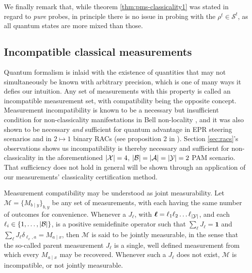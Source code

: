 \documentclass[a4paper,preprintnumbers,floatfix,superscriptaddress,pra,twocolumn,showpacs,notitlepage,longbibliography]{revtex4-2}
\begin{document}
    We finally remark that, while theorem \ref{thm:pms-classicality1} was stated in regard to \emph{pure} probes, in principle there is no issue in probing with the $\rho^t \in  \mathcal{S}^t$, as all quantum states are more mixed than those. 

    
    \subsection{Incompatible classical measurements}
    
        Quantum formalism is inlaid with the existence of quantities that may not simultaneously be known with arbitrary precision, which is one of many ways it defies our intuition. Any set of measurements with this property is called an incompatible measurement set, with compatibility being the opposite concept. Measurement incompatibility is known to be a necessary but insufficient condition for non-classicality manifestations in Bell non-locality \cite{bene-incompatibility-2018,hirsch-incompatibility-2018}, and it was also shown to be necessary \emph{and} sufficient for quantum advantage in EPR steering scenarios \cite{quintino-incompatibility-2014} and in $2 \mapsto 1$ binary RACs (see proposition 2 in \cite{carmeli-racs-2020}). Section \ref{sec:racs}'s observations shows us incompatibility is thereby necessary and sufficient for non-classicality in the aforementioned $\abs{\mathcal{X}} = 4$, $\abs{\mathcal{B}} = \abs{\mathcal{A}} = \abs{\mathcal{Y}} = 2$ PAM scenario. That sufficiency does not hold in general will be shown through an application of our measurements' classicality certification method.
        
        Measurement compatibility may be understood as joint measurability. Let $\mathcal{M} =  \{ M_{b \mid y} \}_{b, y}$ be any set of measurements, with each having the same number of outcomes for convenience. Whenever a $J_{\bm{\ell}}$, with $\bm{\ell} = \ell_1 \ell_2 \ldots \ell_\abs{\mathcal{Y}}$, and each $\ell_i \in \{ 1, \ldots, \abs{\mathcal{B}} \}$, is a positive semidefinite operator such that $\sum_{\bm{\ell}} J_{\bm{\ell}} = \bm{1}$ and $\sum_{\bm{\ell}} J_{\bm{\ell}} \delta_{\ell_x, a} = M_{a \mid x}$, then $\mathcal{M}$ is said to be jointly measurable, in the sense that the so-called parent measurement $J_{\bm{\ell}}$ is a single, well defined measurement from which every $M_{a \mid x}$ may be recovered. Whenever such a $J_{\bm{\ell}}$ does not exist, $\mathcal{M}$ is incompatible, or not jointly measurable.
        
\end{document}
